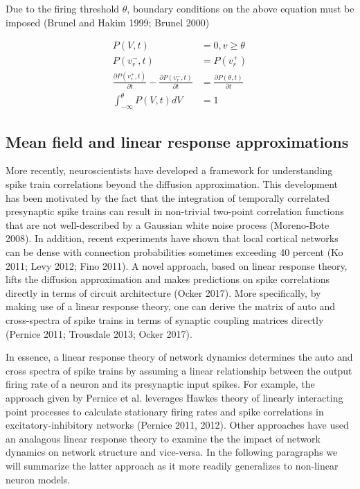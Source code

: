 \documentclass{ucetd}
\begin{document}
Due to the firing threshold $\theta$, boundary conditions on the above equation must be imposed (Brunel and Hakim 1999; Brunel 2000)

\begin{align*}
P(V,t) &= 0, v\geq \theta\\
P(v_{r}^{-},t) &= P(v_{r}^{+})\\
\frac{\partial P(v_{r}^{+},t)}{\partial t}-\frac{\partial P(v_{r}^{-},t)}{\partial t} &= \frac{\partial P(\theta,t)}{\partial t}\\
\int_{-\infty}^{\theta} P(V,t)dV &= 1
\end{align*}


\subsection{Mean field and linear response approximations}

More recently, neuroscientists have developed a framework for understanding spike train correlations beyond the diffusion approximation. This development has been motivated by the fact that the integration of temporally correlated presynaptic spike trains can result in non-trivial two-point correlation functions that are not well-described by a Gaussian white noise process (Moreno-Bote 2008). In addition, recent experiments have shown that local cortical networks can be dense with connection probabilities sometimes exceeding 40 percent (Ko 2011; Levy 2012; Fino 2011). A novel approach, based on linear response theory, lifts the diffusion approximation and makes predictions on spike correlations directly in terms of circuit architecture (Ocker 2017). More specifically, by making use of a linear response theory, one can derive the matrix of auto and cross-spectra of spike trains in terms of synaptic coupling matrices directly (Pernice 2011; Trousdale 2013; Ocker 2017).

In essence, a linear response theory of network dynamics determines the auto and cross spectra of spike trains by assuming a linear relationship between the output firing rate of a neuron and its presynaptic input spikes. For example, the approach given by Pernice et al. leverages Hawkes theory of linearly interacting point processes to calculate stationary firing rates and spike correlations in excitatory-inhibitory networks (Pernice 2011, 2012). Other approaches have used an analagous linear response theory to examine the the impact of network dynamics on network structure and vice-versa. In the following paragraphs we will summarize the latter approach as it more readily generalizes to non-linear neuron models.
\end{document}

